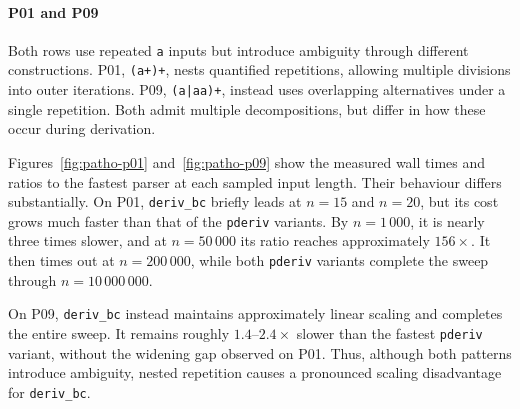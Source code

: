 \paragraph{P01 and P09}
Both rows use repeated \texttt{a} inputs but
introduce ambiguity through different constructions.
P01, \texttt{(a+)+}, nests quantified repetitions,
allowing multiple divisions into outer iterations.
P09, \texttt{(a|aa)+}, instead uses overlapping
alternatives under a single repetition.
Both admit multiple decompositions,
but differ in how these occur during derivation.

Figures~\ref{fig:patho-p01}
and~\ref{fig:patho-p09} show the measured
wall times and ratios to the fastest parser
at each sampled input length.
Their behaviour differs substantially.
On P01, \texttt{deriv\_bc} briefly leads
at $n=15$ and $n=20$, but its cost grows
much faster than that of the \texttt{pderiv} variants.
By $n=1\,000$, it is nearly three times slower,
and at $n=50\,000$ its ratio reaches
approximately $156\times$.
It then times out at $n=200\,000$,
while both \texttt{pderiv} variants complete
the sweep through $n=10\,000\,000$.

On P09, \texttt{deriv\_bc} instead maintains
approximately linear scaling and completes
the entire sweep.
It remains roughly $1.4$--$2.4\times$ slower
than the fastest \texttt{pderiv} variant,
without the widening gap observed on P01.
Thus, although both patterns introduce ambiguity,
nested repetition causes a pronounced
scaling disadvantage for \texttt{deriv\_bc}.

%
%
%

